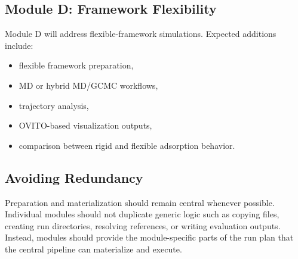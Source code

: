 \subsection{Module D: Framework Flexibility}

Module D will address flexible-framework simulations.
Expected additions include:

\begin{itemize}
    \item flexible framework preparation,
    \item MD or hybrid MD/GCMC workflows,
    \item trajectory analysis,
    \item OVITO-based visualization outputs,
    \item comparison between rigid and flexible adsorption behavior.
\end{itemize}

\subsection{Avoiding Redundancy}

Preparation and materialization should remain central whenever possible.
Individual modules should not duplicate generic logic such as copying files, creating run directories, resolving references, or writing evaluation outputs.
Instead, modules should provide the module-specific parts of the run plan that the central pipeline can materialize and execute.
